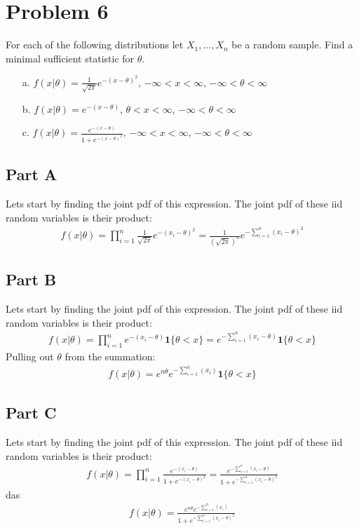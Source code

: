 \documentclass{article}
\begin{document}
\clearpage

\section*{Problem 6}
For each of the following distributions let $X_1,...,X_n$ be a random sample. Find a minimal sufficient statistic for $\theta$.
\begin{enumerate}
\item[a.] $f(x|\theta) = \frac{1}{\sqrt{2\pi}} e^{-(x-\theta)^2}$, $-\infty < x < \infty$, $-\infty < \theta < \infty$
\item[b.] $f(x|\theta) = e^{-(x-\theta)}$, $\theta < x < \infty$, $-\infty < \theta < \infty$
\item[c.] $f(x|\theta) = \frac{e^{-(x-\theta)}}{1+e^{-(x-\theta)^2}} $, $-\infty < x < \infty$, $-\infty < \theta < \infty$
\end{enumerate}
\subsection*{Part A}
Lets start by finding the joint pdf of this expression. The joint pdf of these iid random variables is their product:
\begin{align*}
f(x|\theta) = \prod_{i=1}^{n} \frac{1}{\sqrt{2\pi}} e^{-(x_i-\theta)^2} = \frac{1}{(\sqrt{2\pi})^n} e^{-\sum_{i=1}^{n}(x_i-\theta)^2}
\end{align*}

\subsection*{Part B}
Lets start by finding the joint pdf of this expression. The joint pdf of these iid random variables is their product:
\begin{align*}
f(x|\theta) = \prod_{i=1}^{n} e^{-(x_i-\theta)} \mathbf{1}\{\theta < x\} = e^{-\sum_{i=1}^{n} (x_i-\theta)} \mathbf{1}\{\theta < x\}
\end{align*}
Pulling out $\theta$ from the summation:
\begin{align*}
f(x|\theta) = e^{n\theta} e^{-\sum_{i=1}^{n} (x_i)} \mathbf{1}\{\theta < x\}
\end{align*}

\subsection*{Part C}
Lets start by finding the joint pdf of this expression. The joint pdf of these iid random variables is their product:
\begin{align*}
f(x|\theta) = \prod_{i=1}^{n} \frac{ e^{-(x_i-\theta)} }{1+e^{-(x_i-\theta)^2}} = \frac{ e^{-\sum_{i=1}^{n}(x_i-\theta)} }{1+e^{-\sum_{i=1}^{n}(x_i-\theta)^2}}
\end{align*}
das
\begin{align*}
f(x|\theta) = \frac{e^{n\theta} e^{-\sum_{i=1}^{n}(x_i)} }{1+e^{-\sum_{i=1}^{n}(x_i-\theta)^2}}
\end{align*}

\clearpage
\end{document}
